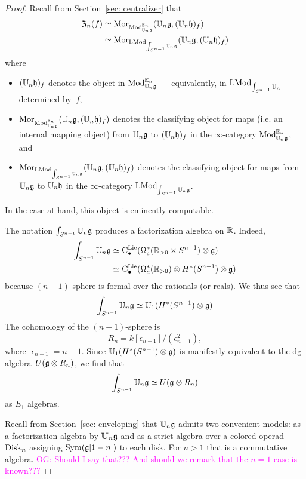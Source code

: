 \documentclass[11pt]{amsart}
\numberwithin{equation}{section}
\def\owen{\textcolor{magenta}{OG: }\textcolor{magenta}}
\begin{document}
\begin{proof}
Recall from Section~\ref{sec: centralizer} that 
\begin{align*}
{\frak Z}_n(f) &\simeq {{\rm Mor}}_{{\rm Mod}^{\mathbb E_n}_{\mathbb U_n\mathfrak g}}(\mathbb U_n \mathfrak g, (\mathbb U_n \mathfrak h)_f) \\
&\simeq {\rm Mor}_{{\rm LMod}_{\int_{S^{n-1}} \mathbb U_n\mathfrak g}}(\mathbb U_n \mathfrak g, (\mathbb U_n \mathfrak h)_f)
\end{align*}
where 
\begin{itemize}
\item $(\mathbb U_n \mathfrak h)_f$ denotes the object in ${\rm Mod}^{\mathbb E_n}_{\mathbb U_n\mathfrak g}$ --- equivalently, in ${\rm LMod}_{\int_{S^{n-1}}\mathbb U_n}$ --- determined by~$f$, 
\item ${\rm Mor}_{{\rm Mod}^{\mathbb E_n}_{\mathbb U_n\mathfrak g}}(\mathbb U_n \mathfrak g, (\mathbb U_n \mathfrak h)_f)$ denotes the classifying object for maps (i.e. an internal mapping object) from $\mathbb U_n\mathfrak g$ to $(\mathbb U_n \mathfrak h)_f$ in the $\infty$-category ${\rm Mod}^{\mathbb E_n}_{\mathbb U_n\mathfrak g}$, and
\item ${\rm Mor}_{{\rm LMod}_{\int_{S^{n-1}} \mathbb U_n\mathfrak g}} (\mathbb U_n \mathfrak g, (\mathbb U_n \mathfrak h)_f)$ denotes the classifying object for maps from ${\mathbb U_n\mathfrak g}$ to $\mathbb U_n \mathfrak h$ in the $\infty$-category ${\rm LMod}_{\int_{S^{n-1}}\mathbb U_n\mathfrak g}$. 
\end{itemize}
In the case at hand, this object is eminently computable.

The notation $\int_{S^{n-1}}\mathbb U_n\mathfrak g$ produces a factorization algebra on $\mathbb R$.
Indeed,
\begin{align*}
\int_{S^{n-1}}\mathbb U_n\mathfrak g 
&\simeq {\rm C}^{\rm Lie}_\bullet(\Omega^*_c(\mathbb R_{> 0} \times S^{n-1}) \otimes \mathfrak g)\\
&\simeq {\rm C}^{\rm Lie}_\bullet(\Omega^*_c(\mathbb R_{> 0}) \otimes H^*(S^{n-1}) \otimes \mathfrak g)
\end{align*}
because $(n-1)$-sphere is formal over the rationals (or reals). 
We thus see that 
\[
\int_{S^{n-1}}\mathbb U_n\mathfrak g \simeq \mathbb U_1 (H^*(S^{n-1}) \otimes \mathfrak g)
\]
The cohomology of the $(n-1)$-sphere is 
\[
R_n = k[\epsilon_{n-1}]/(\epsilon_{n-1}^2),
\] 
where $|\epsilon_{n-1}| = n-1$.
Since $\mathbb U_1 (H^*(S^{n-1}) \otimes \mathfrak g)$ is manifestly equivalent to the dg algebra~$U(\mathfrak g \otimes R_n)$,
we find that 
\[
\int_{S^{n-1}}\mathbb U_n\mathfrak g \simeq U(\mathfrak g \otimes R_n)
\]
as $E_1$ algebras.

Recall from Section~\ref{sec: enveloping} that $\mathbb U_n \mathfrak g$ admits two convenient models:
as a factorization algebra by $\mathbf U_n \mathfrak g$ and as a strict algebra over a colored operad ${\rm Disk}_n$ assigning ${\rm Sym}(\mathfrak g[1-n])$ to each disk.
For $n > 1$ that is a commutative algebra.
\owen{Should I say that??? And should we remark that the $n=1$ case is known???}


\end{proof}
\end{document}
